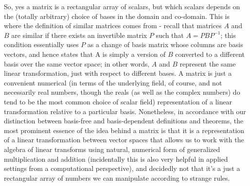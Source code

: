 \documentclass{article}
\newcommand{\nn}{\leavevmode \newline \newline}
\begin{document}
\nn
So, yes a matrix is a rectangular array of scalars, but which scalars depends on the (totally arbitrary) choice of bases in the domain and co-domain. This is where the definition of similar matrices comes from - recall that matrices $A $ and $ B $ are similar if there exists an invertible matrix $ P $ such that $ A = P B P^{-1} $; this condition essentially uses $ P $ as a change of basis matrix whose columns are basis vectors, and hence states that A is simply a version of $ B $ converted to a different basis over the same vector space; in other words, $ A $ and $ B $ represent the same linear transformation, just with respect to different bases. A matrix is just a convenient numerical (in terms of the underlying field, of course, and not necessarily real numbers, though the reals (as well as the complex numbers) do tend to be the most common choice of scalar field) representation of a linear transformation relative to a particular basis. Nonetheless, in accordance with our distinction between basis-free and basis-dependent definitions and theorems, the most prominent essence of the idea behind a matrix is that it is a representation of a linear transformation between vector spaces that allows us to work with the algebra of linear transforms using natural, numerical form of generalized multiplication and addition (incidentally this is also very helpful in applied settings from a computational perspective), and decidedly not that it's a just a rectangular array of numbers we can manipulate according to strange rules.
\nn
\end{document}
